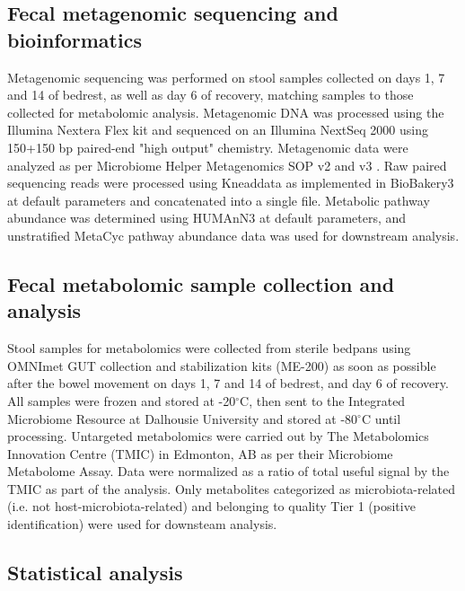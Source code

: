 \documentclass[preprint,12pt,authoryear]{elsarticle}
\begin{document}
\subsection{Fecal metagenomic sequencing and bioinformatics}

    Metagenomic sequencing was performed on stool samples collected on days 1, 7 and 14 of bedrest, as well as day 6 of recovery, matching samples to those collected for metabolomic analysis. Metagenomic DNA was processed using the Illumina Nextera Flex kit and sequenced on an Illumina NextSeq 2000 using 150+150 bp paired-end "high output" chemistry. Metagenomic data were analyzed as per Microbiome Helper Metagenomics SOP v2 and v3 \citep{comeauMicrobiomeHelperCustom2017}. Raw paired sequencing reads were processed using Kneaddata as implemented in BioBakery3 \citep{beghiniIntegratingTaxonomicFunctional2021} at default parameters and concatenated into a single file. Metabolic pathway abundance was determined using HUMAnN3 \citep{beghiniIntegratingTaxonomicFunctional2021} at default parameters, and unstratified MetaCyc pathway abundance data was used for downstream analysis.

\subsection{Fecal metabolomic sample collection and analysis}

    Stool samples for metabolomics were collected from sterile bedpans using OMNImet GUT collection and stabilization kits (ME-200) as soon as possible after the bowel movement on days 1, 7 and 14 of bedrest, and day 6 of recovery. All samples were frozen and stored at -20$^\circ$C, then sent to the Integrated Microbiome Resource at Dalhousie University and stored at -80$^\circ$C until processing. Untargeted metabolomics were carried out by The Metabolomics Innovation Centre (TMIC) in Edmonton, AB as per their Microbiome Metabolome Assay. Data were normalized as a ratio of total useful signal by the TMIC as part of the analysis. Only metabolites categorized as microbiota-related (i.e. not host-microbiota-related) and belonging to quality Tier 1 (positive identification) were used for downsteam analysis.
    
\subsection{Statistical analysis}
    
\end{document}
